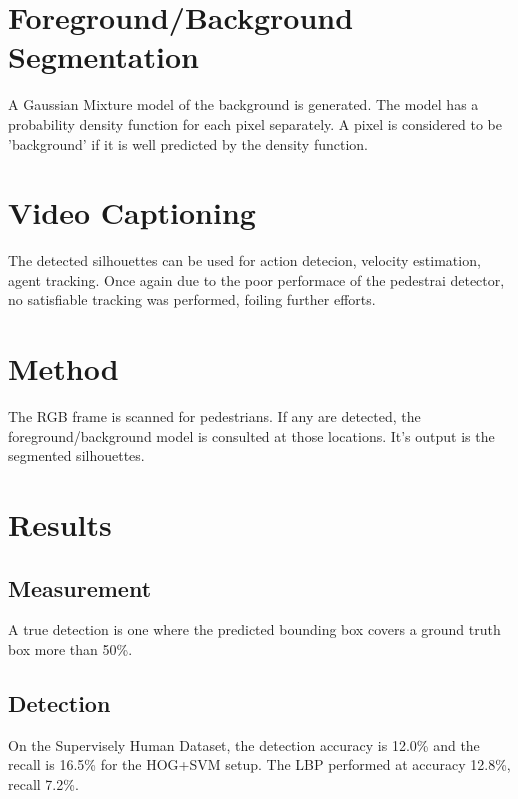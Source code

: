 \documentclass{article}
\begin{document}
\section{Foreground/Background Segmentation}
A Gaussian Mixture model of the background is generated\cite{knn_background_subt}.
The model has a probability density function for each pixel separately.
A pixel is considered to be 'background' if it is well predicted by the density function.


\section{Video Captioning}
The detected silhouettes can be used for action detecion, velocity estimation, agent tracking.
Once again due to the poor performace of the pedestrai detector, no satisfiable tracking was performed, foiling further efforts.


\section{Method}
The RGB frame is scanned for pedestrians.
If any are detected, the foreground/background model is consulted at those locations.
It's output is the segmented silhouettes.


\section{Results}
\subsection{Measurement}
A true detection is one where the predicted bounding box covers a ground truth box more than 50\%.

\subsection{Detection}
On the Supervisely Human Dataset, the detection accuracy is 12.0\% and the recall is 16.5\% for the HOG+SVM setup.
The LBP performed at accuracy 12.8\%, recall 7.2\%.
\end{document}
